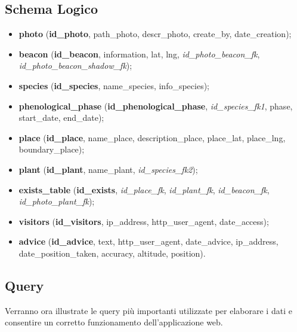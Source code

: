 \newpage
\subsection{Schema Logico}

\begin{itemize}
	\item \textbf{photo}  (\textbf{id\_photo},  path\_photo, descr\_photo,  create\_by, date\_creation);
	
	\item \textbf{beacon} (\textbf{id\_beacon},  information,  lat,  lng,  \textit{id\_photo\_beacon\_fk}, \newline \textit{id\_photo\_beacon\_shadow\_fk});
	
	\item \textbf{species} (\textbf{id\_species},  name\_species,  info\_species);
	
	\item \textbf{phenological\_phase} (\textbf{id\_phenological\_phase},  \textit{id\_species\_fk1},  phase,  start\_date,  end\_date);
	
	\item \textbf{place} (\textbf{id\_place},  name\_place,  description\_place, place\_lat,  place\_lng, boundary\_place);
	
	\item \textbf{plant} (\textbf{id\_plant},  name\_plant,  \textit{id\_species\_fk2});
	
	\item \textbf{exists\_table} (\textbf{id\_exists},  \textit{id\_place\_fk},  \textit{id\_plant\_fk},  \textit{id\_beacon\_fk}, \newline  \textit{id\_photo\_plant\_fk});
	
	\item \textbf{visitors} (\textbf{id\_visitors},  ip\_address,  http\_user\_agent,  date\_access);
	
	\item \textbf{advice} (\textbf{id\_advice},  text,  http\_user\_agent,  date\_advice,  ip\_address,  date\_position\_taken,  accuracy,  altitude,  position).
\end{itemize}

\subsection{Query}
Verranno ora illustrate le query più importanti utilizzate per elaborare i dati e consentire un corretto funzionamento dell'applicazione web. 

